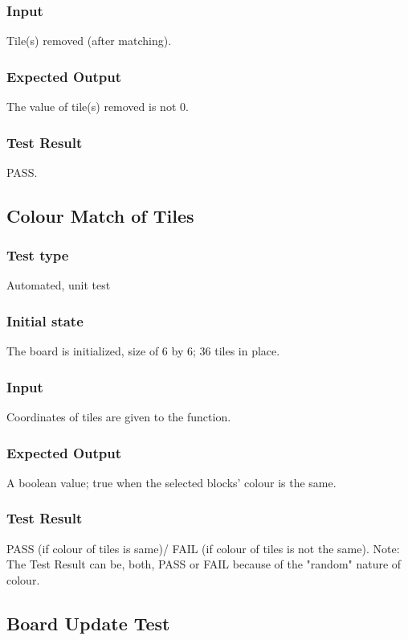 \documentclass[12pt]{article}
\begin{document}
\subsubsection{Input}
Tile(s) removed (after matching).

\subsubsection{Expected Output}
The value of tile(s) removed is not 0.

\subsubsection{Test Result}
PASS.

\newpage

\subsection{Colour Match of Tiles}
\subsubsection{Test type}
Automated, unit test
\subsubsection{Initial state}
The board is initialized, size of 6 by 6; 36 tiles in place.
\subsubsection{Input}
Coordinates of tiles are given to the function.
\subsubsection{Expected Output}
A boolean value; true when the selected blocks' colour is the same.

\subsubsection{Test Result}
PASS (if colour of tiles is same)/ FAIL (if colour of tiles is not the same).
Note: The Test Result can be, both, PASS or FAIL because of the "random" nature of colour.


\newpage

\subsection{Board Update Test}
\end{document}
